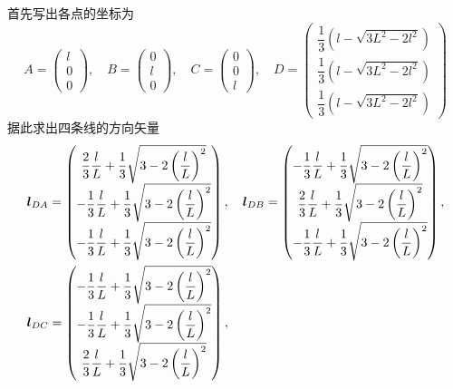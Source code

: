 \begin{solution}
首先写出各点的坐标为
\begin{equation*}
	A = \begin{pmatrix} l \\ 0 \\ 0 \end{pmatrix},\quad B = \begin{pmatrix} 0 \\ l \\ 0 \end{pmatrix},\quad C = \begin{pmatrix} 0 \\ 0 \\ l \end{pmatrix},\quad D = \begin{pmatrix} \dfrac13 \left(l-\sqrt{3L^2-2l^2}\right) \\[1.5ex] \dfrac13 \left(l-\sqrt{3L^2-2l^2}\right) \\[1.5ex] \dfrac13 \left(l-\sqrt{3L^2-2l^2}\right) \end{pmatrix}
\end{equation*}
据此求出四条线的方向矢量
\begin{align*}
	& \mbf{l}_{DA} = \begin{pmatrix} \dfrac23 \dfrac{l}{L} + \dfrac13 \sqrt{3-2\left(\dfrac{l}{L}\right)^2} \\[1.5ex] -\dfrac13 \dfrac{l}{L} + \dfrac13 \sqrt{3-2\left(\dfrac{l}{L}\right)^2} \\[1.5ex] -\dfrac13 \dfrac{l}{L} + \dfrac13 \sqrt{3-2\left(\dfrac{l}{L}\right)^2} \end{pmatrix},\quad
	\mbf{l}_{DB} = \begin{pmatrix}-\dfrac13 \dfrac{l}{L} + \dfrac13 \sqrt{3-2\left(\dfrac{l}{L}\right)^2} \\[1.5ex] \dfrac23 \dfrac{l}{L} + \dfrac13 \sqrt{3-2\left(\dfrac{l}{L}\right)^2} \\[1.5ex] -\dfrac13 \dfrac{l}{L} + \dfrac13 \sqrt{3-2\left(\dfrac{l}{L}\right)^2} \end{pmatrix}, \\
	& \mbf{l}_{DC} = \begin{pmatrix} -\dfrac13 \dfrac{l}{L} + \dfrac13 \sqrt{3-2\left(\dfrac{l}{L}\right)^2} \\[1.5ex] -\dfrac13 \dfrac{l}{L} + \dfrac13 \sqrt{3-2\left(\dfrac{l}{L}\right)^2} \\[1.5ex] \dfrac23 \dfrac{l}{L} + \dfrac13 \sqrt{3-2\left(\dfrac{l}{L}\right)^2} \end{pmatrix},\quad

\end{align*}
\end{solution}
